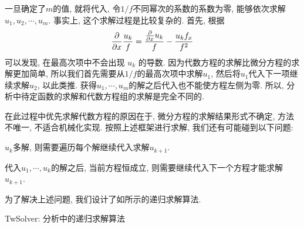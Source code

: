 一旦确定了$m$的值, 就将代入, 令$1/f$不同幂次的系数的系数为零, 能够依次求解$u_1,u_2,\cdots,u_m$. 事实上, 这个求解过程是比较复杂的. 首先, 根据 
\begin{equation}
    \frac{\partial}{\partial x}\frac{u_k}{f}=\frac{\frac{\partial}{\partial x}u_k}{f}-\frac{u_kf_x}{f^2}
\end{equation} 
可以发现, 在最高次项中不会出现 $u_k$ 的导数. 因为代数方程的求解比微分方程的求解更加简单, 所以我们首先需要从$1/f$的最高次项中求解$u_1$, 然后将$u_1$代入下一项继续求解$u_2$, 以此类推. 获得$u_1,\cdots,u_m$的解之后代入也不能使方程左侧为零. 所以, \Painleve{}分析中待定函数的求解和代数方程组的求解是完全不同的.

在此过程中优先求解代数方程的原因在于, 微分方程的求解结果形式不确定, 方法不唯一, 不适合机械化实现. 按照上述框架进行求解, 我们还有可能碰到以下问题: 
\begin{compactenum}[(1)]
\item $u_k$多解, 则需要遍历每个解继续代入求解$u_{k+1}$.
\item 代入$u_1,\cdots,u_k$的解之后, 当前方程恒成立, 则需要继续代入下一个方程才能求解$u_{k+1}$. 
\end{compactenum}

为了解决上述问题, 我们设计了如所示的递归求解算法. 

\begin{algorithm}
\caption{TwSolver: \Painleve{}分析中的递归求解算法}\label{rpsolve}
\end{algorithm}

